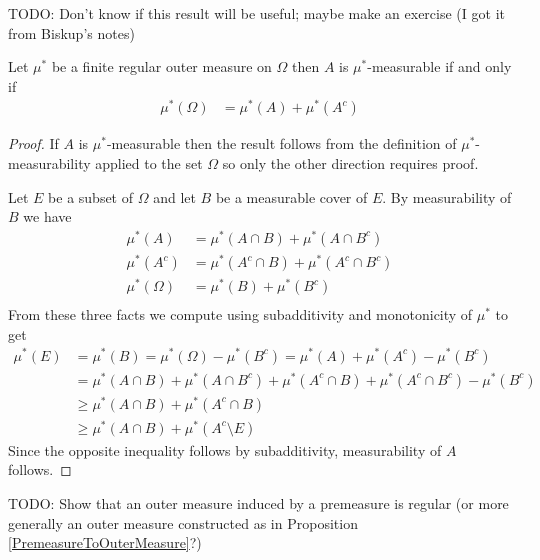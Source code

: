 TODO: Don't know if this result will be useful; maybe make an exercise (I got it from Biskup's notes)
\begin{prop}Let $\mu^*$ be a finite regular outer measure on $\Omega$ then $A$ is $\mu^*$-measurable if  and only if 
\begin{align*}
\mu^*(\Omega) &= \mu^*(A) + \mu^*(A^c)
\end{align*}
\end{prop}
\begin{proof}
If $A$ is $\mu^*$-measurable then the result follows from the definition of $\mu^*$-measurability applied to the set $\Omega$ so only the other direction requires proof.  

Let $E$ be a subset of $\Omega$ and let $B$ be a measurable cover of $E$.
By measurability of $B$ we have
\begin{align*}
\mu^*(A) &= \mu^*(A \cap B) + \mu^*(A \cap B^c) \\
\mu^*(A^c) &= \mu^*(A^c \cap B) + \mu^*(A^c \cap B^c) \\
\mu^*(\Omega) &= \mu^*(B) + \mu^*(B^c)\\
\end{align*}
From these three facts we compute using subadditivity and monotonicity of $\mu^*$ to get
\begin{align*}
\mu^*(E) &= \mu^*(B) = \mu^*(\Omega) - \mu^*(B^c) =\mu^*(A) + \mu^*(A^c) - \mu^*(B^c) \\
&=\mu^*(A \cap B) + \mu^*(A \cap B^c)  + \mu^*(A^c \cap B) + \mu^*(A^c \cap B^c) - \mu^*(B^c) \\
&\geq \mu^*(A \cap B) + \mu^*(A^c \cap  B)  \\
&\geq \mu^*(A \cap B) + \mu^*(A^c \setminus E)
\end{align*}
Since the opposite inequality follows by subadditivity, measurability of $A$ follows.
\end{proof}

TODO: Show that an outer measure induced by a premeasure is regular (or more generally an outer measure constructed as in Proposition \ref{PremeasureToOuterMeasure}?)

